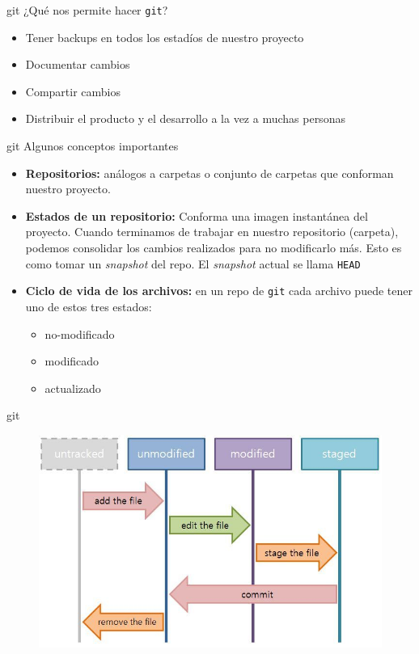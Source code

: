 \documentclass{beamer}
\begin{document}
\begin{frame}{git}
¿Qué nos permite hacer \texttt{git}?
\begin{itemize}
    \item Tener backups en todos los estadíos de nuestro proyecto
    \item Documentar cambios
    \item Compartir cambios
    \item Distribuir el producto y el desarrollo a la vez a muchas personas
\end{itemize}
\end{frame}

\begin{frame}{git}
Algunos conceptos importantes

\begin{itemize}
    \item \textbf{Repositorios:} análogos a carpetas o conjunto de carpetas que conforman nuestro proyecto.
    \item  \textbf{Estados de un repositorio:} Conforma una imagen instantánea del proyecto. Cuando terminamos de trabajar en nuestro repositorio (carpeta), podemos consolidar los cambios realizados para no modificarlo más. Esto es como tomar un \textit{snapshot} del repo. El \textit{snapshot} actual se llama \texttt{HEAD}
    \item \textbf{Ciclo de vida de los archivos:} en un repo de \texttt{git} cada archivo puede tener uno de estos tres estados:
    \begin{itemize}
        \item no-modificado
        \item modificado
        \item actualizado
    \end{itemize}
\end{itemize}
\end{frame}

\begin{frame}{git}
\begin{figure}
    \centering
    \includegraphics[scale=0.45]{file_lifecycle.jpg}
\end{figure}
\end{frame}
\end{document}
